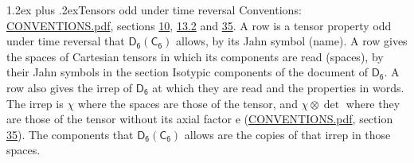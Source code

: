 \documentclass[10pt,a4paper]{article}
\makeatletter
\renewcommand\section{\@startsection{section}{1}{\z@}{-3ex plus -1ex minus -.2ex}%
  {1.2ex plus .2ex}{\normalfont\large\sffamily\bfseries\color{parttitle}}}
\numberwithin{equation}{section}
\newcommand{\grp}[1]{\mathsf{#1}}
\newcommand{\irrprod}{\otimes}
\makeatother
\begin{document}
\section{Tensors odd under time reversal}\label{s:time_odd}
Conventions: \href{../../CONVENTIONS.pdf}{CONVENTIONS.pdf}, sections \href{../../../rotation/CONVENTIONS.pdf\#conv.10}{10}, \href{../../../rotation/CONVENTIONS.pdf\#conv.13.2}{13.2} and \href{../../CONVENTIONS.pdf\#conv.35}{35}.
\leavevmode\label{n:head.name.property}A row is a tensor property odd under time reversal that $\grp{D_{6}}(\grp{C_{6}})$ allows, by its Jahn symbol (name). \label{n:head.spaces}A row gives the spaces of Cartesian tensors in which its components are read (spaces), by their Jahn symbols in the section Isotypic components of the document of \href{../../../rotation/data/pdf/D6.pdf}{$\grp{D_{6}}$}. \label{n:head.properties}A row also gives the irrep of $\grp{D_{6}}$ at which they are read and the properties in words. The irrep is $\chi$ where the spaces are those of the tensor, and $\chi \irrprod \det$ where they are those of the tensor without its axial factor e (\href{../../CONVENTIONS.pdf}{CONVENTIONS.pdf}, section \href{../../CONVENTIONS.pdf\#conv.35}{35}). The components that $\grp{D_{6}}(\grp{C_{6}})$ allows are the copies of that irrep in those spaces.
\end{document}

